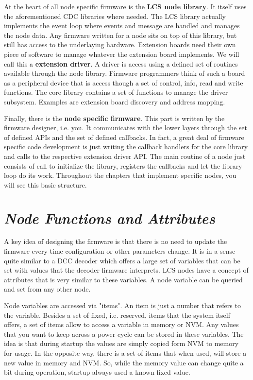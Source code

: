 At the heart of all node specific firmware is the \textbf{LCS node library}. It itself uses the aforementioned CDC libraries where needed. The LCS library actually implements the event loop where events and message are handled and manages the node data. Any firmware written for a node sits on top of this library, but still has access to the underlaying hardware. Extension boards need their own piece of software to manage whatever the extension board implements. We will call this a \textbf{extension driver}. A driver is access using a defined set of routines available through the node library. Firmware programmers think of such a board as a peripheral device that is access though a set of control, info, read and write functions. The core library contains a set of functions to manage the driver subsystem. Examples are extension board discovery and address mapping.

Finally, there is the \textbf{node specific firmware}. This part is written by the firmware designer, i.e. you. It communicates with the lower layers through the set of defined APIs and the set of defined callbacks. In fact, a great deal of firmware specific code development is just writing the callback handlers for the core library and calls to the respective extension driver API.  The main routine of a node just consists of call to initialize the library, registers the callbacks and let the library loop do its work. Throughout the chapters that implement specific nodes, you will see this basic structure.

\section{\textit{Node Functions and Attributes}}

A key idea of designing the firmware is that there is no need to update the firmware every time configuration or other parameters change. It is in a sense quite similar to a DCC decoder which offers a large set of variables that can be set with values that the decoder firmware interprets. LCS nodes have a concept of attributes that is very similar to these variables. A node variable can be queried and set from any other node.

Node variables are accessed via "items". An item is just a number that refers to the variable. Besides a set of fixed, i.e. reserved, items that the system itself offers, a set of items allow to access a variable in memory or NVM. Any values that you want to keep across a power cycle can be stored in these variables. The idea is that during startup the values are simply copied form NVM to memory for usage. In the opposite way, there is a set of items that when used, will store a new value in memory and NVM. So, while the memory value can change quite a bit during operation, startup always used a known fixed value.

